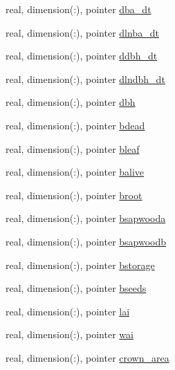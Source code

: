\begin{DoxyCompactItemize}
\item 
real, dimension(\+:), pointer \hyperlink{structed__state__vars_1_1patchtype_a78a9bbdfaf2dd92209758e2907fb1bdd}{dba\+\_\+dt}
\item 
real, dimension(\+:), pointer \hyperlink{structed__state__vars_1_1patchtype_a617cf9c816d0e2ddfdb44653e302362c}{dlnba\+\_\+dt}
\item 
real, dimension(\+:), pointer \hyperlink{structed__state__vars_1_1patchtype_aeecbfae248ac825f1ecf08a17b7b84ec}{ddbh\+\_\+dt}
\item 
real, dimension(\+:), pointer \hyperlink{structed__state__vars_1_1patchtype_aa330a383c7a9c24fcdf928192a8503a7}{dlndbh\+\_\+dt}
\item 
real, dimension(\+:), pointer \hyperlink{structed__state__vars_1_1patchtype_afb1f7ed67f1dd1074cf453125b27370e}{dbh}
\item 
real, dimension(\+:), pointer \hyperlink{structed__state__vars_1_1patchtype_a9d2c3c9798a4fd70b8fa50ef5d6e114b}{bdead}
\item 
real, dimension(\+:), pointer \hyperlink{structed__state__vars_1_1patchtype_a5afc29e900a7a1515a63799d269f0a14}{bleaf}
\item 
real, dimension(\+:), pointer \hyperlink{structed__state__vars_1_1patchtype_a6fc008c912d88b39dfac54881cba6bbf}{balive}
\item 
real, dimension(\+:), pointer \hyperlink{structed__state__vars_1_1patchtype_a04547c38d6d22055b32d113720bcf399}{broot}
\item 
real, dimension(\+:), pointer \hyperlink{structed__state__vars_1_1patchtype_a567ae7dda53aca5672d88d96102bcfbf}{bsapwooda}
\item 
real, dimension(\+:), pointer \hyperlink{structed__state__vars_1_1patchtype_a9f67ab50e89166cb6c62ce45733ed0ef}{bsapwoodb}
\item 
real, dimension(\+:), pointer \hyperlink{structed__state__vars_1_1patchtype_a803d5082ee74b7883d539d0a13bfdde7}{bstorage}
\item 
real, dimension(\+:), pointer \hyperlink{structed__state__vars_1_1patchtype_a8483608b6c8f85229b0b6ff1653b5a7f}{bseeds}
\item 
real, dimension(\+:), pointer \hyperlink{structed__state__vars_1_1patchtype_a6da37901c3e47d1ccc478e46dc857a94}{lai}
\item 
real, dimension(\+:), pointer \hyperlink{structed__state__vars_1_1patchtype_aad0098c6e7705362a895f5b8666b23e5}{wai}
\item 
real, dimension(\+:), pointer \hyperlink{structed__state__vars_1_1patchtype_a24fb07506f728f126851f99abe1ee0b1}{crown\+\_\+area}

\end{DoxyCompactItemize}

